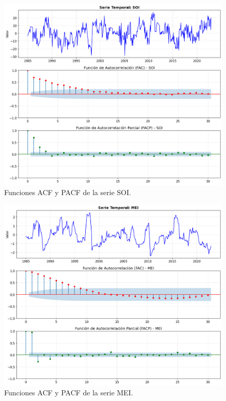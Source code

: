 \begin{figure}[H]
    \centering
    \includegraphics[scale=.42]{Figures/facp_SOI.png}
    \caption{Funciones ACF y PACF de la serie SOI.}
    \label{fig:facp_soi}
\end{figure}

\begin{figure}[H]
    \centering
    \includegraphics[scale=.42]{Figures/facp_MEI.png}
    \caption{Funciones ACF y PACF de la serie MEI.}
    \label{fig:facp_mei}
\end{figure}

